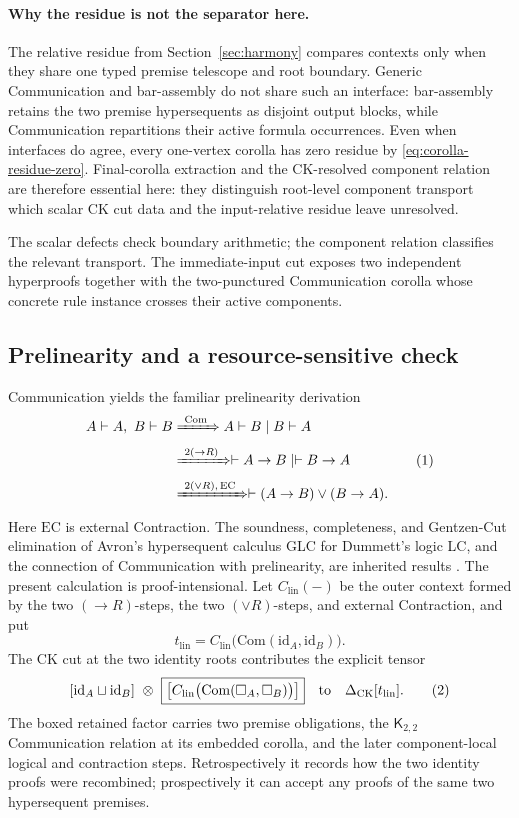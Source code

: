 \documentclass[10pt,a4paper]{article}
\theoremstyle{plain}
\theoremstyle{definition}
\theoremstyle{remark}
\newcommand{\DeltaCK}{\Delta_{\mathrm{CK}}}
\newcommand{\ms}{\mathrel{\vdash}}
\newcommand{\fjoin}{\mathbin{\sqcup}}
\newcommand{\eqtag}{\refstepcounter{equation}\tag{\theequation}}
\begin{document}
\paragraph{Why the residue is not the separator here.}
The relative residue from Section~\ref{sec:harmony} compares contexts only
when they share one typed premise telescope and root boundary.  Generic
Communication and bar-assembly do not share such an interface:
bar-assembly retains the two premise hypersequents as disjoint output
blocks, while Communication repartitions their active formula
occurrences.  Even when interfaces do agree, every one-vertex corolla has
zero residue by \eqref{eq:corolla-residue-zero}.
Final-corolla extraction and the CK-resolved component relation are
therefore essential here: they distinguish root-level component transport
which scalar CK cut data and the input-relative residue leave unresolved.

The scalar defects check boundary arithmetic; the component relation
classifies the relevant transport.  The immediate-input cut exposes
two independent hyperproofs together with the two-punctured Communication
corolla whose concrete rule instance crosses their active components.

\subsection{Prelinearity and a resource-sensitive check}

Communication yields the familiar prelinearity derivation
\[
\begin{aligned}
 A\ms A,\ B\ms B
 &\xRightarrow{\ \mathrm{Com}\ }
       A\ms B\mid B\ms A\\
 &\xRightarrow{\ 2(\to R)\ }
       \ms A\to B\mid\ms B\to A\\
 &\xRightarrow{\ 2(\lor R),\,\mathrm{EC}\ }
       \ms (A\to B)\lor(B\to A).
\end{aligned}
\eqtag\label{eq:prelinearity-derivation}
\]
Here \(\mathrm{EC}\) is external Contraction.  The soundness, completeness,
and Gentzen-Cut elimination of Avron's hypersequent calculus GLC for
Dummett's logic LC, and the
connection of Communication with prelinearity, are inherited results
\cite{avron1991,avron1996hypersequents,
baazciabattonifermuller2003}.  The present calculation is
proof-intensional.  Let \(C_{\mathrm{lin}}(-)\) be the outer context
formed by the two \((\to R)\)-steps, the two \((\lor R)\)-steps, and
external Contraction, and put
\[
 t_{\mathrm{lin}}
   =C_{\mathrm{lin}}\bigl(
       \mathrm{Com}(\mathrm{id}_A,\mathrm{id}_B)\bigr).
\]
The CK cut at the two identity roots contributes the explicit tensor
\[
 [\mathrm{id}_A\fjoin\mathrm{id}_B]\ \otimes\
 \boxed{\bigl[
 C_{\mathrm{lin}}\bigl(\mathrm{Com}(\Box_A,\Box_B)\bigr)
 \bigr]}
 \quad\text{to}\quad \DeltaCK[t_{\mathrm{lin}}].
\eqtag\label{eq:prelinearity-ck-factor}
\]
The boxed retained factor carries two premise obligations, the
\(\mathsf K_{2,2}\) Communication relation at its embedded corolla, and
the later component-local logical and contraction steps.  Retrospectively
it records how the two identity proofs were recombined; prospectively it
can accept any proofs of the same two hypersequent premises.
\end{document}
